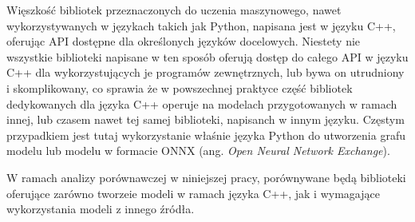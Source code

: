 Więszkość bibliotek przeznaczonych do uczenia maszynowego, nawet wykorzystywanych w językach takich jak Python, napisana jest w języku C++, oferując API dostępne dla określonych języków docelowych. Niestety nie wszystkie biblioteki napisane w ten sposób oferują dostęp do całego API w języku C++ dla wykorzystujących je programów zewnętrznych, lub bywa on utrudniony i skomplikowany, co sprawia że w powszechnej praktyce część bibliotek dedykowanych dla języka C++ operuje na modelach przygotowanych w ramach innej, lub czasem nawet tej samej biblioteki, napisanch w innym języku. Częstym przypadkiem jest tutaj wykorzystanie właśnie języka Python do utworzenia grafu modelu lub modelu w formacie ONNX (ang. \textit{Open Neural Network Exchange}). 

W ramach analizy porównawczej w niniejszej pracy, porównywane będą biblioteki oferujące zarówno tworzeie modeli w ramach języka C++, jak i wymagające wykorzystania modeli z innego źródła. 